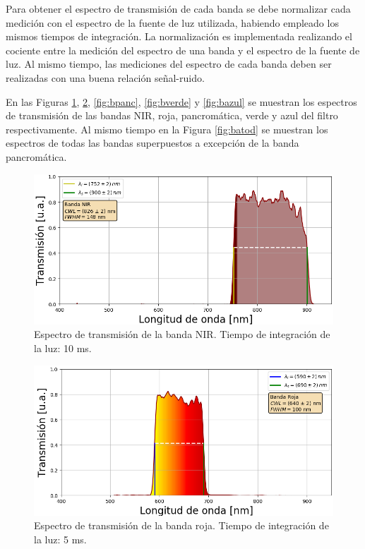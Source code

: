 Para obtener el espectro de transmisión de cada banda se debe normalizar cada medición con el espectro de la fuente de luz utilizada, habiendo empleado los mismos tiempos de integración. La normalización es implementada realizando el cociente entre la medición del espectro de una banda y el espectro de la fuente de luz. Al mismo tiempo, las mediciones del espectro de cada banda deben ser realizadas con una buena relación señal-ruido.

En las Figuras \ref{fig:bnir}, \ref{fig:broja}, \ref{fig:bpanc}, \ref{fig:bverde} y \ref{fig:bazul} se muestran los espectros de transmisión de las bandas NIR, roja, pancromática, verde y azul del filtro respectivamente. Al mismo tiempo en la Figura \ref{fig:batod} se muestran los espectros de todas las bandas superpuestos a excepción de la banda pancromática.
\begin{figure}[H]
	\centering
	\includegraphics[scale=0.8]{Figs/microespectrometro/espectro_nirt.png}
	\caption{Espectro de transmisión de la banda NIR. Tiempo de integración de la luz: 10 ms.}
	\label{fig:bnir}
\end{figure}
\begin{figure}[H]
	\centering
	\includegraphics[scale=0.8]{Figs/microespectrometro/espectro_rojat.png}
	\caption{Espectro de transmisión de la banda roja. Tiempo de integración de la luz: 5 ms.}
	\label{fig:broja}
\end{figure}
